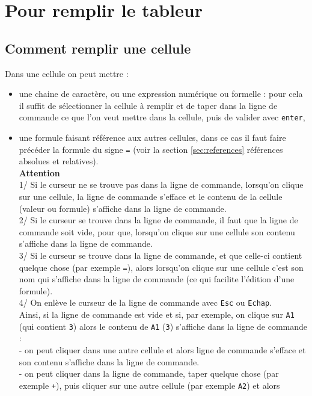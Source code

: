\documentclass[a4paper,11pt]{book}
\begin{document}
\section{Pour remplir le tableur}
\subsection{Comment remplir une cellule}
Dans une cellule on peut mettre :\\
\begin{itemize}
\item une chaine de caract\`ere, ou une expression
num\'erique ou formelle : pour cela il suffit de s\'electionner la cellule 
\`a remplir et de taper dans la ligne de commande ce que l'on veut mettre 
dans la cellule, puis de valider avec {\tt enter},
\item une formule faisant r\'ef\'erence aux autres cellules, dans ce cas il 
faut faire pr\'ec\'eder la formule du signe {\tt =} (voir la section 
\ref{sec:references} r\'ef\'erences absolues et relatives).\\
{\bf Attention}\\
1/ Si le curseur ne se trouve pas dans la ligne de commande, lorsqu'on clique 
sur une cellule, la ligne de commande s'efface et le contenu de la cellule
(valeur ou formule) s'affiche dans la ligne de commande.\\
2/ Si le curseur se trouve dans la ligne de commande, il faut que  
la ligne de commande soit vide, pour que, lorsqu'on clique sur une cellule
son contenu s'affiche dans la ligne de commande.\\
3/ Si le curseur se trouve dans la ligne de commande, et que celle-ci contient
quelque chose (par exemple {\tt =}), alors lorsqu'on clique sur une cellule
 c'est son nom qui  s'affiche dans la ligne de commande (ce qui facilite
l'\'edition d'une formule).\\ 
4/ On enl\`eve le curseur de la ligne de commande avec {\tt Esc} ou {\tt Echap}.\\
Ainsi, si la ligne de commande est vide et si, par exemple, on clique sur 
{\tt A1} (qui contient {\tt 3}) alors le contenu de {\tt A1} ({\tt 3}) 
s'affiche dans la ligne de commande : \\
- on peut cliquer dans une autre cellule et alors ligne de commande s'efface 
et son contenu s'affiche dans la ligne de commande.\\
- on peut cliquer dans la ligne de commande, taper quelque chose (par exemple 
{\tt +}), puis cliquer sur une autre  cellule (par exemple {\tt A2}) et alors 

\end{itemize}
\end{document}

